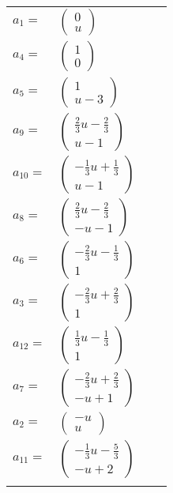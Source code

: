 \documentclass[1p]{elsarticle_modified}
\theoremstyle{definition}
\begin{document}
\begin{tabular}{m{7pt} m{180pt} m{7pt} m{180pt} }
\flushright $a_{1}=$&$\begin{pmatrix}0\\u\end{pmatrix}$ \\
\flushright $a_{4}=$&$\begin{pmatrix}1\\0\end{pmatrix}$ \\
\flushright $a_{5}=$&$\begin{pmatrix}1\\u-3\end{pmatrix}$ \\
\flushright $a_{9}=$&$\begin{pmatrix}\frac{2}{3} u-\frac{2}{3}\\u-1\end{pmatrix}$ \\
\flushright $a_{10}=$&$\begin{pmatrix}-\frac{1}{3} u+\frac{1}{3}\\u-1\end{pmatrix}$ \\
\flushright $a_{8}=$&$\begin{pmatrix}\frac{2}{3} u-\frac{2}{3}\\- u-1\end{pmatrix}$ \\
\flushright $a_{6}=$&$\begin{pmatrix}-\frac{2}{3} u-\frac{1}{3}\\1\end{pmatrix}$ \\
\flushright $a_{3}=$&$\begin{pmatrix}-\frac{2}{3} u+\frac{2}{3}\\1\end{pmatrix}$ \\
\flushright $a_{12}=$&$\begin{pmatrix}\frac{1}{3} u-\frac{1}{3}\\1\end{pmatrix}$ \\
\flushright $a_{7}=$&$\begin{pmatrix}-\frac{2}{3} u+\frac{2}{3}\\- u+1\end{pmatrix}$ \\
\flushright $a_{2}=$&$\begin{pmatrix}- u\\u\end{pmatrix}$ \\
\flushright $a_{11}=$&$\begin{pmatrix}-\frac{1}{3} u-\frac{5}{3}\\- u+2\end{pmatrix}$\\&\end{tabular}
\end{document}
